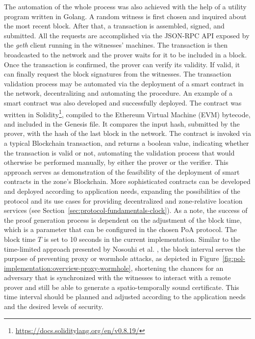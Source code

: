 The automation of the whole process was also achieved with the help of a utility program written in Golang. A random witness is first chosen and inquired about the most recent block. After that, a transaction is assembled, signed, and submitted. All the requests are accomplished via the JSON-RPC API exposed by the \emph{geth} client running in the witnesses' machines. The transaction is then broadcasted to the network and the prover waits for it to be included in a block. Once the transaction is confirmed, the prover can verify its validity. If valid, it can finally request the block signatures from the witnesses. The transaction validation process may be automated via the deployment of a smart contract in the network, decentralizing and automating the procedure. An example of a smart contract was also developed and successfully deployed. The contract was written in Solidity\footnote{\url{https://docs.soliditylang.org/en/v0.8.19/}}, compiled to the Ethereum Virtual Machine (EVM) bytecode, and included in the Genesis file. It compares the input hash, submitted by the prover, with the hash of the last block in the network. The contract is invoked via a typical Blockchain transaction, and returns a boolean value, indicating whether the transaction is valid or not, automating the validation process that would otherwise be performed manually, by either the prover or the verifier. This approach serves as demonstration of the feasibility of the deployment of smart contracts in the zone's Blockchain. More sophisticated contracts can be developed and deployed according to application needs, expanding the possibilities of the protocol and its use cases for providing decentralized and zone-relative location services (see Section~\ref{sec:protocol-fundamentals-clock}). As a note, the success of the proof generation process is dependent on the adjustment of the block time, which is a parameter that can be configured in the chosen PoA protocol. The block time $T$ is set to 10 seconds in the current implementation. Similar to the time-limited approach presented by Nosouhi et al. \cite{nosouhi2020blockchain}, the block interval serves the purpose of preventing proxy or wormhole attacks, as depicted in Figure~\ref{fig:pol-implementation:overview-proxy-wormhole}, shortening the chances for an adversary that is synchronized with the witnesses to interact with a remote prover and still be able to generate a spatio-temporally sound \pol{} certificate. This time interval should be planned and adjusted according to the application needs and the desired levels of security.

